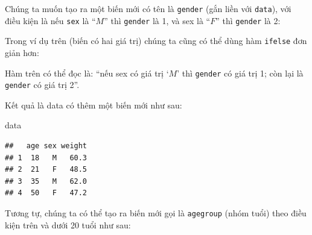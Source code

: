 \documentclass[
]{book}
\newenvironment{Shaded}{\begin{snugshade}}{\end{snugshade}}
\newcommand{\DecValTok}[1]{\textcolor[rgb]{0.00,0.00,0.81}{#1}}
\newcommand{\KeywordTok}[1]{\textcolor[rgb]{0.13,0.29,0.53}{\textbf{#1}}}
\newcommand{\NormalTok}[1]{#1}
\newcommand{\OperatorTok}[1]{\textcolor[rgb]{0.81,0.36,0.00}{\textbf{#1}}}
\newcommand{\StringTok}[1]{\textcolor[rgb]{0.31,0.60,0.02}{#1}}
\begin{document}
Chúng ta muốn tạo ra một biến mới có tên là \texttt{gender} (gắn liền với \texttt{data}), với điều kiện là nếu \texttt{sex} là ``\(M\)'' thì \texttt{gender} là 1, và sex là ``\(F\)'' thì \texttt{gender} là 2:

\begin{Shaded}
\end{Shaded}

Trong ví dụ trên (biến có hai giá trị) chúng ta cũng có thể dùng hàm \texttt{ifelse} đơn giản hơn:

\begin{Shaded}
\end{Shaded}

Hàm trên có thể đọc là: ``nếu sex có giá trị `\(M\)' thì \texttt{gender} có giá trị 1; còn lại là \texttt{gender} có giá trị 2''.

Kết quả là data có thêm một biến mới như sau:

\begin{Shaded}
\begin{Highlighting}[]
\NormalTok{data}
\end{Highlighting}
\end{Shaded}

\begin{verbatim}
##   age sex weight
## 1  18   M   60.3
## 2  21   F   48.5
## 3  35   M   62.0
## 4  50   F   47.2
\end{verbatim}

Tương tự, chúng ta có thể tạo ra biến mới gọi là \texttt{agegroup} (nhóm tuổi) theo điều kiện trên và dưới 20 tuổi như sau:

\begin{Shaded}
\end{Shaded}
\end{document}
